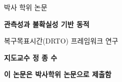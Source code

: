 
\thispagestyle{empty}

\begingroup
\setlength{\parskip}{0pt}
\setlength{\parindent}{0pt}

\vspace*{0.5cm}
{\fontsize{14}{20}\selectfont 박사 학위 논문}

\vspace*{1.5cm}

\begin{center}
  \begin{minipage}{13cm}  %
    \centering
    {\fontsize{18}{18}\selectfont\bfseries
    관측성과 불확실성 기반 동적\par
    복구목표시간(DRTO) 프레임워크 연구\par}
  \end{minipage}
\end{center}

\vspace*{1.0cm}

\begin{center}
  \begin{minipage}{13cm}
    \centering
    {\fontsize{14}{26}\selectfont\bfseries
      지도교수 정  종  수
    }\par
  \end{minipage}
\end{center}

\vspace*{0.5cm}

\begin{center}
  \begin{minipage}{13cm}
    \centering
    {\fontsize{14}{26}\selectfont\bfseries
      이 논문은 박사학위 논문으로 제출함
    }\par
  \end{minipage}
\end{center}

